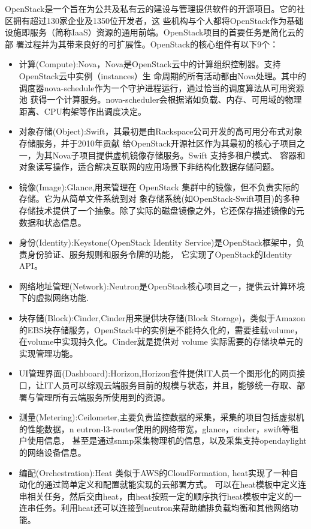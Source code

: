 OpenStack是一个旨在为公共及私有云的建设与管理提供软件的开源项目。它的社区拥有超过130家企业及1350位开发者，这
些机构与个人都将OpenStack作为基础设施即服务（简称IaaS）资源的通用前端。OpenStack项目的首要任务是简化云的部
署过程并为其带来良好的可扩展性。OpenStack的核心组件有以下9个：
\begin{itemize}
\item 计算(Compute):Nova，Nova是OpenStack云中的计算组织控制器。支持OpenStack云中实例（instances）生
命周期的所有活动都由Nova处理。其中的调度器nova-schedule作为一个守护进程运行，通过恰当的调度算法从可用资源池
获得一个计算服务。nova-scheduler会根据诸如负载、内存、可用域的物理距离、CPU构架等作出调度决定。
\item 对象存储(Object):Swift，其最初是由Rackspace公司开发的高可用分布式对象存储服务，并于2010年贡献
给OpenStack开源社区作为其最初的核心子项目之一，为其Nova子项目提供虚机镜像存储服务。Swift 支持多租户模式、
容器和对象读写操作，适合解决互联网的应用场景下非结构化数据存储问题。
\item 镜像(Image):Glance,用来管理在 OpenStack 集群中的镜像，但不负责实际的存储。它为从简单文件系统到对
象存储系统(如OpenStack-Swift项目)的多种存储技术提供了一个抽象。除了实际的磁盘镜像之外，它还保存描述镜像的元数据和状态信息。
\item 身份(Identity):Keystone(OpenStack Identity Service)是OpenStack框架中，负责身份验证、服务规则和服务令牌的功能， 它实现了OpenStack的Identity API。
\item 网络地址管理(Network):Neutron是OpenStack核心项目之一，提供云计算环境下的虚拟网络功能.
\item 块存储(Block):Cinder,Cinder用来提供块存储(Block Storage)，类似于Amazon的EBS块存储服务，OpenStack中的实例是不能持久化的，需要挂载volume，在volume中实现持久化。Cinder就是提供对 volume 实际需要的存储块单元的实现管理功能。
\item UI管理界面(Dashboard):Horizon,Horizon套件提供IT人员一个图形化的网页接口，让IT人员可以综观云端服务目前的规模与状态，并且，能够统一存取、部署与管理所有云端服务所使用到的资源。
\item 测量(Metering):Ceilometer,主要负责监控数据的采集，采集的项目包括虚拟机的性能数据，n
eutron-l3-router使用的网络带宽，glance，cinder，swift等租户使用信息，
甚至是通过snmp采集物理机的信息，以及采集支持opendaylight的网络设备信息。
\item 编配(Orchestration):Heat 类似于AWS的CloudFormation, heat实现了一种自动化的通过简单定义和配置就能实现的云部署方式。
可以在heat模板中定义连串相关任务，然后交由heat，由heat按照一定的顺序执行heat模板中定义的一连串任务。利用heat还可以连接到neutron来帮助编排负载均衡和其他网络功能。
\end{itemize}

